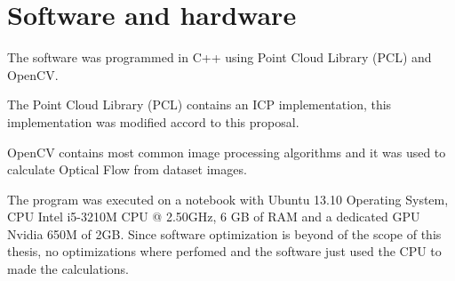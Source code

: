 \section{Software and hardware}

The software was programmed in C++ using Point Cloud Library (PCL) and OpenCV.

The Point Cloud Library (PCL) contains an ICP implementation, this implementation 
was modified accord to this proposal.

OpenCV contains most common image processing algorithms and it was used to calculate 
Optical Flow from dataset images. 


The program was executed on a notebook with Ubuntu 13.10 Operating System, 
CPU Intel i5-3210M CPU @ 2.50GHz, 6 GB of RAM 
and a dedicated GPU Nvidia 650M of 2GB. Since software optimization is beyond of the scope 
of this thesis, no optimizations where perfomed and the software just used the CPU to 
made the calculations.
